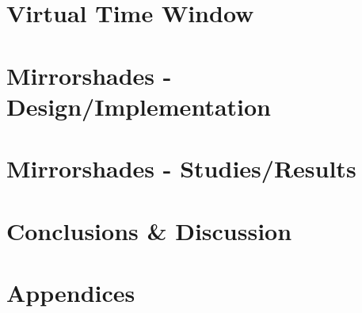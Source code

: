 \documentclass{report}
\begin{document}

\chapter{Virtual Time Window}
\graphicspath{ {04_vtw/} }



\chapter{Mirrorshades - Design/Implementation}
\graphicspath{ {05_mirrorshades_design_implementation/} }



\chapter{Mirrorshades - Studies/Results}
\graphicspath{ {06_mirrorshades_studies_results/} }



\chapter{Conclusions \& Discussion}



\chapter*{Appendices}





\end{document}
